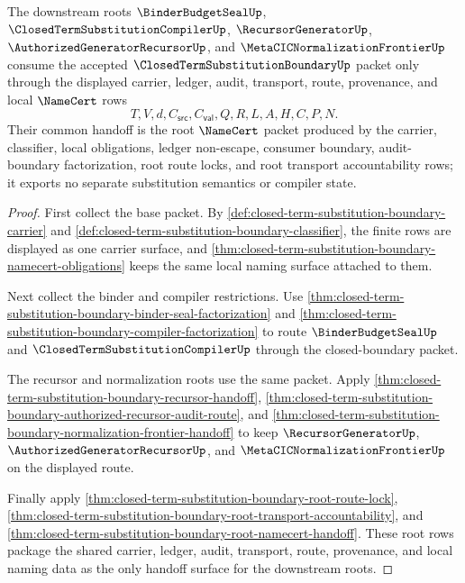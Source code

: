 \begin{theorem}
\label{thm:closed-term-substitution-boundary-downstream-root-handoff}
The downstream roots $\BinderBudgetSealUp$, $\ClosedTermSubstitutionCompilerUp$, $\RecursorGeneratorUp$, $\AuthorizedGeneratorRecursorUp$, and $\MetaCICNormalizationFrontierUp$ consume the accepted $\ClosedTermSubstitutionBoundaryUp$ packet only through the displayed carrier, ledger, audit, transport, route, provenance, and local $\NameCert$ rows
$$
T,V,d,C_{\mathsf{src}},C_{\mathsf{val}},Q,R,L,A,H,C,P,N.
$$
Their common handoff is the root $\NameCert$ packet produced by the carrier, classifier, local obligations, ledger non-escape, consumer boundary, audit-boundary factorization, root route locks, and root transport accountability rows; it exports no separate substitution semantics or compiler state.
\end{theorem}
\begin{proof}
First collect the base packet. By \autoref{def:closed-term-substitution-boundary-carrier} and \autoref{def:closed-term-substitution-boundary-classifier}, the finite rows are displayed as one carrier surface, and \autoref{thm:closed-term-substitution-boundary-namecert-obligations} keeps the same local naming surface attached to them.

Next collect the binder and compiler restrictions. Use \autoref{thm:closed-term-substitution-boundary-binder-seal-factorization} and \autoref{thm:closed-term-substitution-boundary-compiler-factorization} to route $\BinderBudgetSealUp$ and $\ClosedTermSubstitutionCompilerUp$ through the closed-boundary packet.

The recursor and normalization roots use the same packet. Apply \autoref{thm:closed-term-substitution-boundary-recursor-handoff}, \autoref{thm:closed-term-substitution-boundary-authorized-recursor-audit-route}, and \autoref{thm:closed-term-substitution-boundary-normalization-frontier-handoff} to keep $\RecursorGeneratorUp$, $\AuthorizedGeneratorRecursorUp$, and $\MetaCICNormalizationFrontierUp$ on the displayed route.

Finally apply \autoref{thm:closed-term-substitution-boundary-root-route-lock}, \autoref{thm:closed-term-substitution-boundary-root-transport-accountability}, and \autoref{thm:closed-term-substitution-boundary-root-namecert-handoff}. These root rows package the shared carrier, ledger, audit, transport, route, provenance, and local naming data as the only handoff surface for the downstream roots.
\end{proof}
